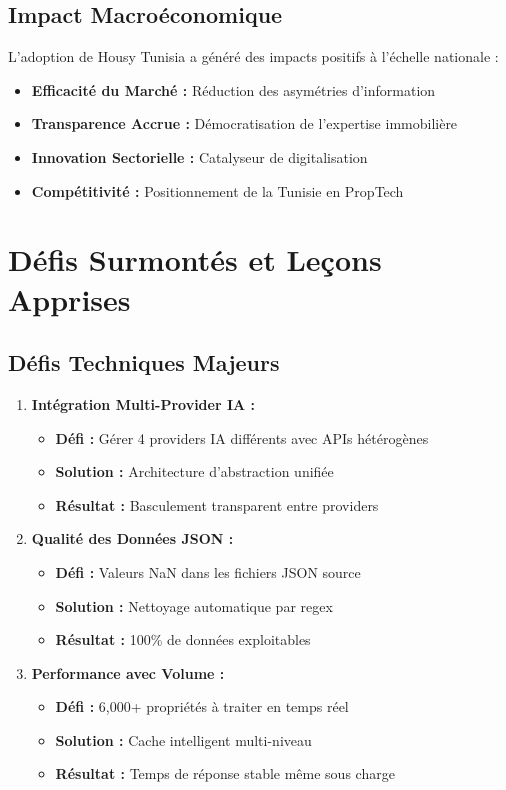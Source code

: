 \subsection{Impact Macroéconomique}

L'adoption de Housy Tunisia a généré des impacts positifs à l'échelle nationale :

\begin{itemize}
    \item \textbf{Efficacité du Marché :} Réduction des asymétries d'information
    \item \textbf{Transparence Accrue :} Démocratisation de l'expertise immobilière
    \item \textbf{Innovation Sectorielle :} Catalyseur de digitalisation
    \item \textbf{Compétitivité :} Positionnement de la Tunisie en PropTech
\end{itemize}

\section{Défis Surmontés et Leçons Apprises}

\subsection{Défis Techniques Majeurs}

\begin{enumerate}
    \item \textbf{Intégration Multi-Provider IA :}
    \begin{itemize}
        \item \textbf{Défi :} Gérer 4 providers IA différents avec APIs hétérogènes
        \item \textbf{Solution :} Architecture d'abstraction unifiée
        \item \textbf{Résultat :} Basculement transparent entre providers
    \end{itemize}
    
    \item \textbf{Qualité des Données JSON :}
    \begin{itemize}
        \item \textbf{Défi :} Valeurs NaN dans les fichiers JSON source
        \item \textbf{Solution :} Nettoyage automatique par regex
        \item \textbf{Résultat :} 100\% de données exploitables
    \end{itemize}
    
    \item \textbf{Performance avec Volume :}
    \begin{itemize}
        \item \textbf{Défi :} 6,000+ propriétés à traiter en temps réel
        \item \textbf{Solution :} Cache intelligent multi-niveau
        \item \textbf{Résultat :} Temps de réponse stable même sous charge
    \end{itemize}
\end{enumerate}

